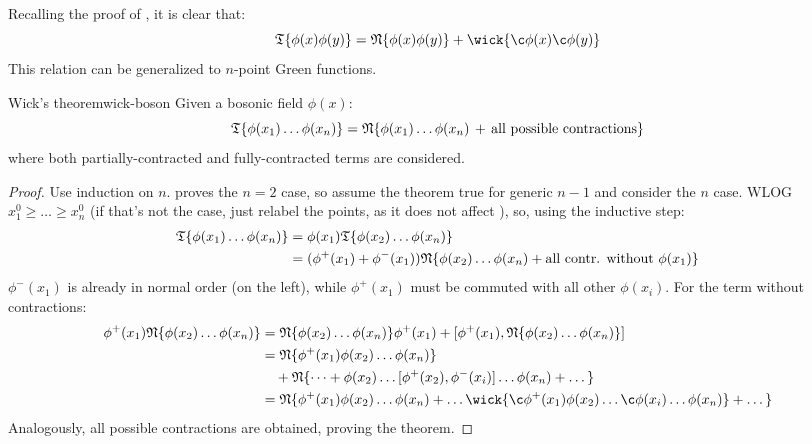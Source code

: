 Recalling the proof of , it is clear that:
\begin{equation}
  \tempord\{\phi(x) \phi(y)\} = \normord\{\phi(x) \phi(y)\} + \wick{\c\phi(x) \c\phi(y)}
  \label{eq:wick-th-2}
\end{equation}
This relation can be generalized to $ n $-point Green functions.

\begin{theorem}{Wick's theorem}{wick-boson}
  Given a bosonic field $ \phi(x) $:
  \begin{equation}
    \mathfrak{T}\{\phi(x_1) \dots \phi(x_n)\} = \mathfrak{N}\{\phi(x_1) \dots \phi(x_n) \,+\, \text{all possible contractions}\}
    \label{eq:wick-th}
  \end{equation}
  where both partially-contracted and fully-contracted terms are considered.
\end{theorem}

\begin{proofbox}
  \begin{proof}
    Use induction on $ n $.  proves the $ n = 2 $ case, so assume the theorem true for generic $ n-1 $ and consider the $ n $ case. WLOG $ x_1^0 \ge \dots \ge x_n^0 $ (if that's not the case, just relabel the points, as it does not affect ), so, using the inductive step:
    \begin{equation*}
      \begin{split}
        \mathfrak{T}\{\phi(x_1) \dots \phi(x_n)\}
        & = \phi(x_1) \mathfrak{T}\{\phi(x_2) \dots \phi(x_n)\} \\
        & = (\phi^+(x_1) + \phi^-(x_1)) \mathfrak{N}\{\phi(x_2) \dots \phi(x_n) + \text{all contr. without } \phi(x_1)\}
      \end{split}
    \end{equation*}
    $ \phi^-(x_1) $ is already in normal order (on the left), while $ \phi^+(x_1) $ must be commuted with all other $ \phi(x_i) $. For the term without contractions:
    \begin{equation*}
      \begin{split}
        \phi^+(x_1) \normord\{\phi(x_2) \dots \phi(x_n)\}
        & = \normord\{\phi(x_2) \dots \phi(x_n)\} \phi^+(x_1) + [\phi^+(x_1) , \normord\{\phi(x_2) \dots \phi(x_n)\}] \\
        & = \normord\{\phi^+(x_1) \phi(x_2) \dots \phi(x_n)\} \\
        & \quad + \normord\{\dots + \phi(x_2) \dots [\phi^+(x_2) , \phi^-(x_i)] \dots \phi(x_n) + \dots\} \\
        & = \normord\{\phi^+(x_1) \phi(x_2) \dots \phi(x_n) + \dots \wick{\c\phi^+(x_1) \phi(x_2) \dots \c\phi(x_i) \dots \phi(x_n)} + \dots\}
      \end{split}
    \end{equation*}
    Analogously, all possible contractions are obtained, proving the theorem.
  \end{proof}
\end{proofbox}

